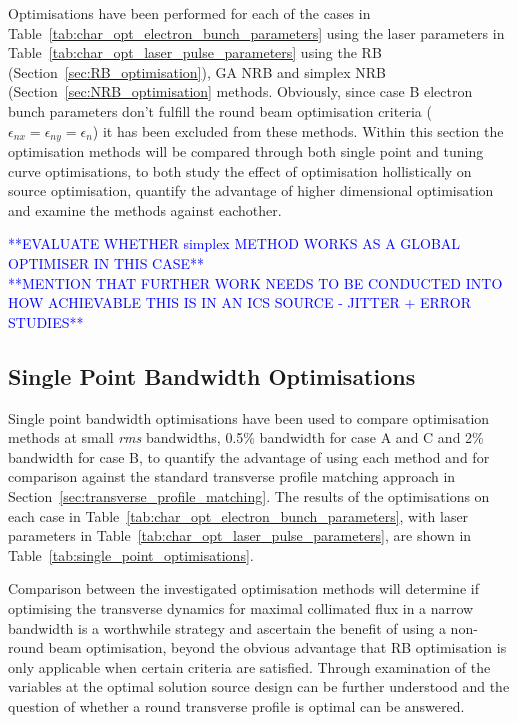 \documentclass[../main.tex]{subfiles}
\begin{document}
Optimisations have been performed for each of the cases in Table~\ref{tab:char_opt_electron_bunch_parameters} using the laser parameters in Table~\ref{tab:char_opt_laser_pulse_parameters} using the RB (Section~\ref{sec:RB_optimisation}), GA NRB and simplex NRB (Section~\ref{sec:NRB_optimisation} methods. Obviously, since case B electron bunch parameters don't fulfill the round beam optimisation criteria ($\epsilon_{nx} = \epsilon_{ny} = \epsilon_{n}$) it has been excluded from these methods. Within this section the optimisation methods will be compared through both single point and tuning curve optimisations, to both study the effect of optimisation hollistically on source optimisation, quantify the advantage of higher dimensional optimisation and examine the methods against eachother.   

\textcolor{blue}{**EVALUATE WHETHER simplex METHOD WORKS AS A GLOBAL OPTIMISER IN THIS CASE** \\ **MENTION THAT FURTHER WORK NEEDS TO BE CONDUCTED INTO HOW ACHIEVABLE THIS IS IN AN ICS SOURCE - JITTER + ERROR STUDIES** \\}

\subsection{Single Point Bandwidth Optimisations}

Single point bandwidth optimisations have been used to compare optimisation methods at small \textit{rms} bandwidths, 0.5\%  bandwidth for case A and C and 2\%  bandwidth for case B, to quantify the advantage of using each method and for comparison against the standard transverse profile matching approach in Section~\ref{sec:transverse_profile_matching}. The results of the optimisations on each case in Table~\ref{tab:char_opt_electron_bunch_parameters}, with laser parameters in Table~\ref{tab:char_opt_laser_pulse_parameters}, are shown in Table~\ref{tab:single_point_optimisations}. 

Comparison between the investigated optimisation methods will determine if optimising the transverse dynamics for maximal collimated flux in a narrow bandwidth is a worthwhile strategy and ascertain the benefit of using a non-round beam optimisation, beyond the obvious advantage that RB optimisation is only applicable when certain criteria are satisfied. Through examination of the variables at the optimal solution source design can be further understood and the question of whether a round transverse profile is optimal can be answered.      
\end{document}
